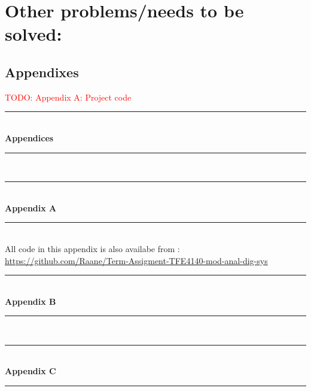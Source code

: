 \documentclass[a4paper]{IEEEtran}
\newcommand\TODO[1]{\textcolor{red}{TODO:#1}}
\newcommand\todo[1]{\TODO{#1}}
\begin{document}
\section{ Other problems/needs to be solved:}
\subsection{ Appendixes}
\todo{ Appendix A: Project code }
\break



\nocite{*}

\clearpage
\begin{titlepage}
    \newcommand{\HRule}{\rule{\linewidth}{0.5mm}} %
    \center %
    \vspace*{3cm}
    \HRule \\[0.4cm]
    { \huge \bfseries Appendices}\\[0.4cm] %
    \HRule \\[1.5cm]
\end{titlepage}
\clearpage
\begin{titlepage}
    \newcommand{\HRule}{\rule{\linewidth}{0.5mm}} %
    \center %
    \vspace*{3cm}
    \HRule \\[0.4cm]
    { \huge \bfseries Appendix A}\\[0.4cm] %
    \HRule \\[1.5cm]
    All code in this appendix is also availabe from : \break \href{https://github.com/Raane/Term-Assigment-TFE4140-mod-anal-dig-sys}{https://github.com/Raane/Term-Assigment-TFE4140-mod-anal-dig-sys}
\end{titlepage}
%
\clearpage
\begin{titlepage}
    \newcommand{\HRule}{\rule{\linewidth}{0.5mm}} %
    \center %
    \vspace*{3cm}
    \HRule \\[0.4cm]
    { \huge \bfseries Appendix B}\\[0.4cm] %
    \HRule \\[1.5cm]
\end{titlepage}

\clearpage
\begin{titlepage}
    \newcommand{\HRule}{\rule{\linewidth}{0.5mm}} %
    \center %
    \vspace*{3cm}
    \HRule \\[0.4cm]
    { \huge \bfseries Appendix C}\\[0.4cm] %
    \HRule \\[1.5cm]
\end{titlepage}

\end{document}
